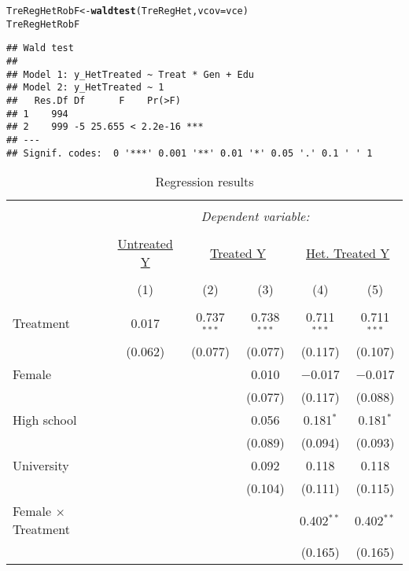 \documentclass[11pt, a4paper]{article}\usepackage[]{graphicx}\usepackage[]{color}
\makeatletter
\newcommand{\hlstd}[1]{\textcolor[rgb]{0.345,0.345,0.345}{#1}}%
\newcommand{\hlkwb}[1]{\textcolor[rgb]{0.69,0.353,0.396}{#1}}%
\newcommand{\hlkwc}[1]{\textcolor[rgb]{0.333,0.667,0.333}{#1}}%
\newcommand{\hlkwd}[1]{\textcolor[rgb]{0.737,0.353,0.396}{\textbf{#1}}}%
\newenvironment{kframe}{%
 \def\at@end@of@kframe{}%
 \ifinner\ifhmode%
  \def\at@end@of@kframe{\end{minipage}}%
  \begin{minipage}{\columnwidth}%
 \fi\fi%
 \def\FrameCommand##1{\hskip\@totalleftmargin \hskip-\fboxsep
 \colorbox{shadecolor}{##1}\hskip-\fboxsep
     \hskip-\linewidth \hskip-\@totalleftmargin \hskip\columnwidth}%
 \MakeFramed {\advance\hsize-\width
   \@totalleftmargin\z@ \linewidth\hsize
   \@setminipage}}%
 {\par\unskip\endMakeFramed%
 \at@end@of@kframe}
\newenvironment{knitrout}{}{} %
\makeatother
\begin{document}
\begin{knitrout}
\begin{kframe}
\begin{alltt}
  \hlstd{TreRegHetRobF} \hlkwb{<-} \hlkwd{waldtest}\hlstd{(TreRegHet,} \hlkwc{vcov} \hlstd{= vce)}
  \hlstd{TreRegHetRobF}
\end{alltt}
\begin{verbatim}
## Wald test
## 
## Model 1: y_HetTreated ~ Treat * Gen + Edu
## Model 2: y_HetTreated ~ 1
##   Res.Df Df      F    Pr(>F)    
## 1    994                        
## 2    999 -5 25.655 < 2.2e-16 ***
## ---
## Signif. codes:  0 '***' 0.001 '**' 0.01 '*' 0.05 '.' 0.1 ' ' 1
\end{verbatim}
\end{kframe}
\end{knitrout}


\begin{table}[!htbp] \centering 
  \caption{Regression results} 
  \label{} 
\begin{tabular}{@{\extracolsep{5pt}}lccccc} 
\\[-1.8ex]\hline 
\hline \\[-1.8ex] 
 & \multicolumn{5}{c}{\textit{Dependent variable:}} \\ 
\cline{2-6} 
\\[-1.8ex] & \underline{Untreated Y} & \multicolumn{2}{c}{\underline{Treated Y}} & \multicolumn{2}{c}{\underline{Het. Treated Y}} \\ 
\\[-1.8ex] & (1) & (2) & (3) & (4) & (5)\\ 
\hline \\[-1.8ex] 
 Treatment & 0.017 & 0.737$^{***}$ & 0.738$^{***}$ & 0.711$^{***}$ & 0.711$^{***}$ \\ 
  & (0.062) & (0.077) & (0.077) & (0.117) & (0.107) \\ 
  Female &  &  & 0.010 & $-$0.017 & $-$0.017 \\ 
  &  &  & (0.077) & (0.117) & (0.088) \\ 
  High school &  &  & 0.056 & 0.181$^{*}$ & 0.181$^{*}$ \\ 
  &  &  & (0.089) & (0.094) & (0.093) \\ 
  University &  &  & 0.092 & 0.118 & 0.118 \\ 
  &  &  & (0.104) & (0.111) & (0.115) \\ 
  Female $\times$ Treatment &  &  &  & 0.402$^{**}$ & 0.402$^{**}$ \\ 
  &  &  &  & (0.165) & (0.165) \\ 

\end{tabular}
\end{table}
\end{document}
